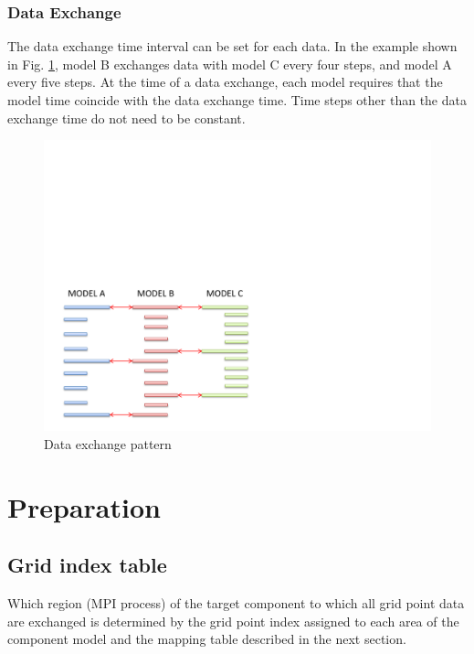 \documentclass[11pt,a4paper]{report}
\newcommand{\figref}[1]{Fig. \ref{#1}}
\begin{document}
\subsection{Data Exchange}
The data exchange time interval can be set for each data.
In the example shown in \figref{fig:data_exchange_pattern}, model B exchanges data with model C every four steps, and model A every five steps.
At the time of a data exchange, each model requires that the model time coincide with the data exchange time.
Time steps other than the data exchange time do not need to be constant.

\begin{figure}[H]
\begin{center}
\includegraphics[bb = 0 0 500 300, scale=0.6, clip]{figs/data_exchange_pattern.pdf}
\caption{Data exchange pattern}
\label{fig:data_exchange_pattern}
\end{center}
\end{figure}



\chapter{Preparation}
\section{Grid index table}
Which region (MPI process) of the target component to which all grid point data are exchanged is determined by the grid point index assigned to each area of the component model and the mapping table described in the next section.
\end{document}

